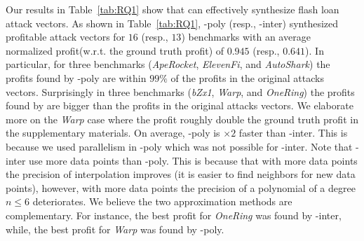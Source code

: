 Our results in Table~\ref{tab:RQ1} show that {\name} can effectively synthesize
flash loan attack vectors. As shown in Table~\ref{tab:RQ1}, {\name}-poly
(resp., {\name}-inter) synthesized profitable attack vectors for $16$ (resp.,
$13$) benchmarks with an average normalized profit(w.r.t. the ground
truth profit) of $0.945$ (resp., $0.641$). In particular, for three benchmarks
(\emph{ApeRocket}, \emph{ElevenFi}, and \emph{AutoShark}) the profits found by
{\name}-poly are within $99\%$ of the profits in the original attacks vectors.
Surprisingly in three benchmarks (\emph{bZx1}, \emph{Warp}, and \emph{OneRing})
the profits found by {\name} are bigger than the profits in the original
attacks vectors. We elaborate more on the \emph{Warp} case where the profit
roughly double the ground truth profit in the supplementary materials. 
On average, {\name}-poly is $\times2$ faster than {\name}-inter. This is
because we used parallelism in {\name}-poly which was not possible for
{\name}-inter. Note that {\name}-inter use more data points than {\name}-poly.
This is because that with more data points the precision of interpolation
improves (it is easier to find neighbors for new data points), however, with
more data points the precision of a polynomial of a degree $n \leq 6$
deteriorates.  We believe the two approximation methods are complementary. For
instance, the best profit for \emph{OneRing} was found by {\name}-inter, while,
the best profit for \emph{Warp} was found by {\name}-poly.



